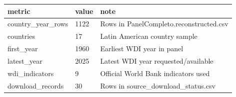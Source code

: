 ﻿%
\begin{tabular}{lll}
\hline
metric & value & note \\
\hline
country\_year\_rows & 1122 & Rows in PanelCompleto.reconstructed.csv \\
countries & 17 & Latin American country sample \\
first\_year & 1960 & Earliest WDI year in panel \\
latest\_year & 2025 & Latest WDI year requested/available \\
wdi\_indicators & 9 & Official World Bank indicators used \\
download\_records & 30 & Rows in source\_download\_status.csv \\
\hline
\end{tabular}

